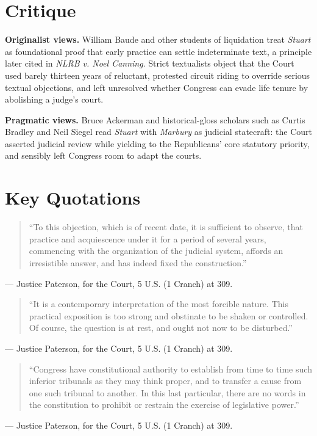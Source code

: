 \documentclass[12pt]{article}
\begin{document}
\section{Critique}

\textbf{Originalist views.} William Baude and other students of liquidation treat \textit{Stuart} as foundational proof that early practice can settle indeterminate text, a principle later cited in \textit{NLRB v. Noel Canning}. Strict textualists object that the Court used barely thirteen years of reluctant, protested circuit riding to override serious textual objections, and left unresolved whether Congress can evade life tenure by abolishing a judge's court.

\textbf{Pragmatic views.} Bruce Ackerman and historical-gloss scholars such as Curtis Bradley and Neil Siegel read \textit{Stuart} with \textit{Marbury} as judicial statecraft: the Court asserted judicial review while yielding to the Republicans' core statutory priority, and sensibly left Congress room to adapt the courts.

\section{Key Quotations}

\begin{quote}
``To this objection, which is of recent date, it is sufficient to observe, that practice and acquiescence under it for a period of several years, commencing with the organization of the judicial system, affords an irresistible answer, and has indeed fixed the construction.''
\end{quote}
\noindent --- Justice Paterson, for the Court, 5 U.S. (1 Cranch) at 309.

\begin{quote}
``It is a contemporary interpretation of the most forcible nature. This practical exposition is too strong and obstinate to be shaken or controlled. Of course, the question is at rest, and ought not now to be disturbed.''
\end{quote}
\noindent --- Justice Paterson, for the Court, 5 U.S. (1 Cranch) at 309.

\begin{quote}
``Congress have constitutional authority to establish from time to time such inferior tribunals as they may think proper, and to transfer a cause from one such tribunal to another. In this last particular, there are no words in the constitution to prohibit or restrain the exercise of legislative power.''
\end{quote}
\noindent --- Justice Paterson, for the Court, 5 U.S. (1 Cranch) at 309.
\end{document}
